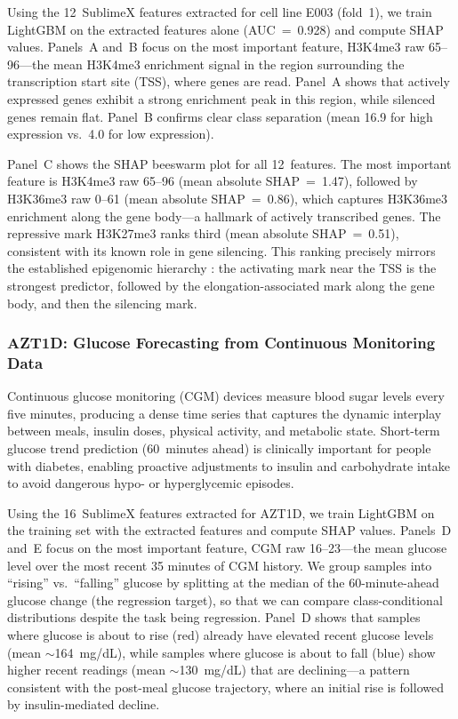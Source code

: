 \documentclass[times, review, 10pt]{elsarticle}
\begin{document}
Using the 12~SublimeX features extracted for cell line E003
(fold~1), we train LightGBM on the extracted features alone
(AUC~=~0.928) and compute SHAP values.
Panels~A and~B focus on the most important feature,
H3K4me3 raw 65--96---the mean H3K4me3 enrichment signal
in the region surrounding the transcription
start site (TSS), where genes are read. Panel~A
shows that actively expressed genes exhibit a strong
enrichment peak in this region, while silenced genes remain
flat. Panel~B confirms clear class separation (mean 16.9
for high expression vs.\ 4.0 for low expression).

Panel~C shows the SHAP beeswarm plot for all 12~features.
The most important feature is H3K4me3 raw 65--96
(mean absolute SHAP~=~1.47), followed by H3K36me3 raw
0--61 (mean absolute SHAP~=~0.86), which captures
H3K36me3 enrichment along the gene body---a hallmark of
actively transcribed genes. The repressive mark H3K27me3
ranks third (mean absolute SHAP~=~0.51), consistent
with its known role in gene silencing. This ranking
precisely mirrors the established epigenomic hierarchy
\cite{karlic2010histone, howe2017h3k4me3}: the activating
mark near the TSS is the strongest predictor, followed by
the elongation-associated mark along the gene body, and
then the silencing mark.

\subsubsection{AZT1D: Glucose Forecasting from
Continuous Monitoring Data}

Continuous glucose monitoring (CGM) devices measure blood
sugar levels every five minutes, producing a dense time
series that captures the dynamic interplay between meals,
insulin doses, physical activity, and metabolic state.
Short-term glucose trend prediction (60~minutes
ahead) is clinically important for people with diabetes,
enabling proactive adjustments to insulin and
carbohydrate intake to avoid dangerous hypo- or
hyperglycemic episodes.

Using the 16~SublimeX features extracted for AZT1D, we train LightGBM on the training set with the extracted features and compute SHAP values. Panels~D and~E
focus on the most important feature, CGM raw 16--23---the mean glucose level over the most recent 35 minutes of CGM history.
We group samples into ``rising'' vs.\ ``falling'' glucose by splitting at the
median of the 60-minute-ahead glucose change (the regression target), so that
we can compare class-conditional distributions despite the task being regression.
Panel~D shows that samples where glucose is about to rise (red) already have elevated recent glucose levels
(mean ${\sim}$164~mg/dL), while samples where glucose
is about to fall (blue) show higher recent readings
(mean ${\sim}$130~mg/dL) that are declining---a pattern
consistent with the post-meal glucose trajectory, where an
initial rise is followed by insulin-mediated decline.
\end{document}
